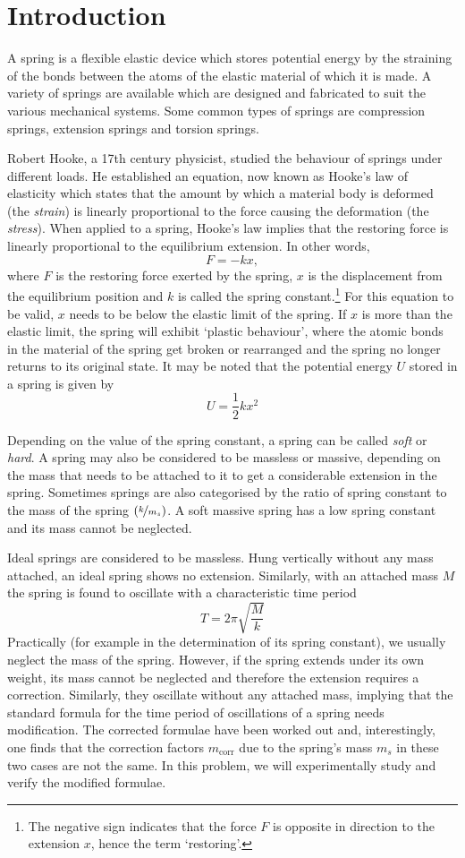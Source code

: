 \section*{Introduction}

A spring is a flexible elastic device which stores potential energy by the straining of the bonds between the atoms of the elastic material of which it is made. A variety of springs are available which are designed and fabricated to suit the various mechanical systems. Some common types of springs are compression springs, extension springs and torsion springs. 

Robert Hooke, a 17th century physicist, studied the behaviour of springs under different loads. He established an equation, now known as Hooke’s law of elasticity which states that the amount by which a material body is deformed (the \textit{strain}) is linearly proportional to the force causing the deformation (the \textit{stress}). When applied to a spring, Hooke’s law implies that the restoring force is linearly proportional to the equilibrium extension. In other words,  $$F = - k x,$$ where $F$ is the restoring force exerted by the spring, $x$ is the displacement from the equilibrium position and $k$ is called the spring constant.\footnote{The negative sign indicates that the force $F$ is opposite in direction to the extension $x$, hence the term `restoring'.} For this equation to be valid, $x$ needs to be below the elastic limit of the spring. If $x$ is more than the elastic limit, the spring will exhibit `plastic behaviour', where the atomic bonds in the material of the spring get broken or rearranged and the spring no longer returns to its original state. It may be noted that the potential energy $U$ stored in a spring is given by $$U= \frac{1}{2} k x^2$$

Depending on the value of the spring constant, a spring can be called \textit{soft} or \textit{hard}. A spring may also be considered to be massless or massive, depending on the mass that needs to be attached to it to get a considerable extension in the spring. Sometimes springs are also categorised by the ratio of spring constant to the mass of the spring $(\nicefrac{k}{m_s})$. A soft massive spring has a low spring constant and its mass cannot be neglected. 

Ideal springs are considered to be massless. Hung vertically without any mass attached, an ideal spring shows no extension. Similarly, with an attached mass $M$ the spring is found to oscillate with a characteristic time period $$T = 2\pi \sqrt{\frac{M}{k}}$$ Practically (for example in the determination of its spring constant), we usually neglect the mass of the spring. However, if the spring extends under its own weight, its mass cannot be neglected and therefore the extension requires a correction. Similarly, they oscillate without any attached mass, implying that the standard formula for the time period of oscillations of a spring needs modification. The corrected formulae have been worked out and, interestingly, one finds that the correction factors $m_\text{corr}$ due to the spring's mass $m_s$ in these two cases are not the same. In this problem, we will experimentally study and verify the modified formulae. 

